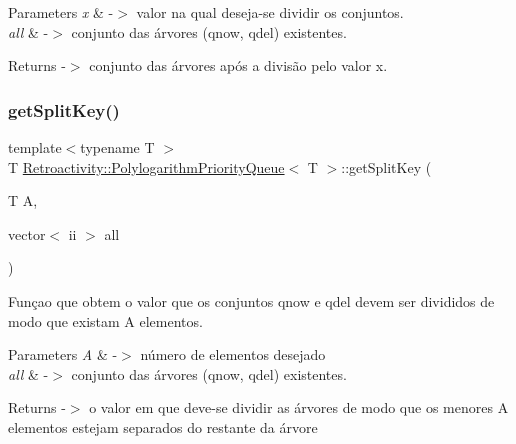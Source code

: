 \begin{DoxyParams}{Parameters}
{\em x} & -\/$>$ valor na qual deseja-\/se dividir os conjuntos. \\
\hline
{\em all} & -\/$>$ conjunto das árvores (qnow, qdel) existentes. \\
\hline
\end{DoxyParams}
\begin{DoxyReturn}{Returns}
-\/$>$ conjunto das árvores após a divisão pelo valor x. 
\end{DoxyReturn}
\mbox{\label{classRetroactivity_1_1PolylogarithmPriorityQueue_a19a0f1350c94228d0a8d0e3bc8e6fd7f}} 
\subsubsection{\texorpdfstring{get\+Split\+Key()}{getSplitKey()}}
{\footnotesize\ttfamily template$<$typename T $>$ \\
T \hyperlink{classRetroactivity_1_1PolylogarithmPriorityQueue}{Retroactivity\+::\+Polylogarithm\+Priority\+Queue}$<$ T $>$\+::get\+Split\+Key (\begin{DoxyParamCaption}\item[{T}]{A,  }\item[{vector$<$ ii $>$}]{all }\end{DoxyParamCaption})}

Funçao que obtem o valor que os conjuntos qnow e qdel devem ser divididos de modo que existam A elementos.


\begin{DoxyParams}{Parameters}
{\em A} & -\/$>$ número de elementos desejado \\
\hline
{\em all} & -\/$>$ conjunto das árvores (qnow, qdel) existentes. \\
\hline
\end{DoxyParams}
\begin{DoxyReturn}{Returns}
-\/$>$ o valor em que deve-\/se dividir as árvores de modo que os menores A elementos estejam separados do restante da árvore 
\end{DoxyReturn}
\mbox{\label{classRetroactivity_1_1PolylogarithmPriorityQueue_a63c8782f290dd5ae66259401dcbf8e40}} 
